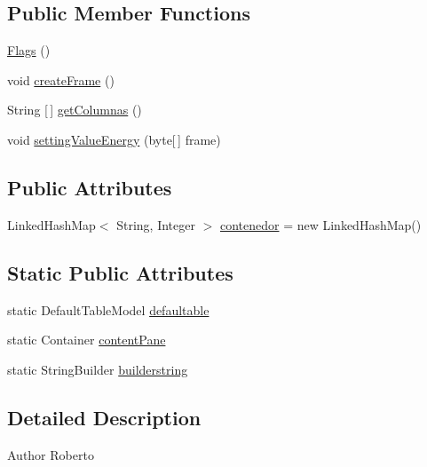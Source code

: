 \subsection*{Public Member Functions}
\begin{DoxyCompactItemize}
\item 
\hyperlink{classcom_1_1eneri_1_1scorpio__metertool_1_1ui_1_1_flags_a75f0e185e4432f2a32d8724e1a34c705}{Flags} ()
\item 
void \hyperlink{classcom_1_1eneri_1_1scorpio__metertool_1_1ui_1_1_flags_a2821bdb99e784a90011209340ba9b604}{create\+Frame} ()
\item 
String \mbox{[}$\,$\mbox{]} \hyperlink{classcom_1_1eneri_1_1scorpio__metertool_1_1ui_1_1_flags_a56a92674edf42a9523c02c31de74aa38}{get\+Columnas} ()
\item 
void \hyperlink{classcom_1_1eneri_1_1scorpio__metertool_1_1ui_1_1_flags_a19f186d9007be2f6e2a596e2aed81827}{setting\+Value\+Energy} (byte\mbox{[}$\,$\mbox{]} frame)
\end{DoxyCompactItemize}
\subsection*{Public Attributes}
\begin{DoxyCompactItemize}
\item 
Linked\+Hash\+Map$<$ String, Integer $>$ \hyperlink{classcom_1_1eneri_1_1scorpio__metertool_1_1ui_1_1_flags_a60a09892ae564fb0645ffd660e7f3ccb}{contenedor} = new Linked\+Hash\+Map()
\end{DoxyCompactItemize}
\subsection*{Static Public Attributes}
\begin{DoxyCompactItemize}
\item 
static Default\+Table\+Model \hyperlink{classcom_1_1eneri_1_1scorpio__metertool_1_1ui_1_1_flags_a15f1ce51c65d55e12106fa988e5c4fbd}{defaultable}
\item 
static Container \hyperlink{classcom_1_1eneri_1_1scorpio__metertool_1_1ui_1_1_flags_a0df79a6928c132ab4280b41df552ffea}{content\+Pane}
\item 
static String\+Builder \hyperlink{classcom_1_1eneri_1_1scorpio__metertool_1_1ui_1_1_flags_a7cf086a9cf8ed2b3525d9ab51e3121b2}{builderstring}
\end{DoxyCompactItemize}


\subsection{Detailed Description}
\begin{DoxyAuthor}{Author}
Roberto 
\end{DoxyAuthor}


